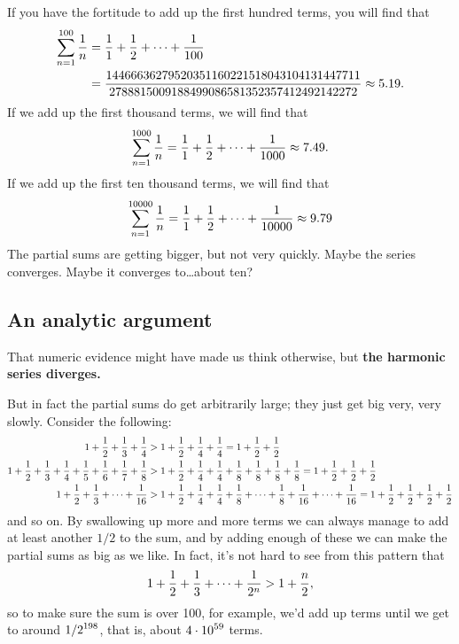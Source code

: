 If you have the fortitude to add up the first hundred terms, you will find that
\begin{align*}
\sum_{n=1}^{100} {1\over n} &= \frac{1}{1} + \frac{1}{2} + \cdots + \frac{1}{100} \\
&= \frac{14466636279520351160221518043104131447711}{2788815009188499086581352357412492142272} \approx 5.19.
\end{align*}
If we add up the first thousand terms, we will find that
\begin{align*}
\sum_{n=1}^{1000} {1\over n} &= \frac{1}{1} + \frac{1}{2} + \cdots + \frac{1}{1000} \approx 7.49. \\
\end{align*}
If we add up the first ten thousand terms, we will find that
\begin{align*}
\sum_{n=1}^{10000} {1\over n} &= \frac{1}{1} + \frac{1}{2} + \cdots + \frac{1}{10000} \approx 9.79 \\
\end{align*}
The partial sums are getting bigger, but not very quickly.  Maybe the
series converges.  Maybe it converges to\ldots about ten?

\subsection{An analytic argument}

That numeric evidence might have made us think otherwise, but
\textbf{the harmonic series diverges.}

But in fact the partial sums do get arbitrarily large; they just get
big very, very slowly. Consider the following:
\begin{align*}
\displaystyle 1+{1\over 2}+{1\over 3}+{1\over 4} &> 
1+{1\over 2}+{1\over 4}+{1\over
  4} = 1+{1\over 2}+{1\over 2} \\
\displaystyle 1+{1\over 2}+{1\over 3}+{1\over 4}+
{1\over 5}+{1\over 6}+{1\over
    7}+{1\over 8} &> 
1+{1\over 2}+{1\over 4}+{1\over 4}+{1\over 8}+{1\over 8}+{1\over
    8}+{1\over 8} = 1+{1\over 2}+{1\over 2}+{1\over 2} \\
\displaystyle 1+{1\over 2}+{1\over 3}+\cdots+{1\over16} &> 
1+{1\over 2}+{1\over 4}+{1\over 4}+{1\over 8}+\cdots+{1\over
  8}+{1\over16}+\cdots +{1\over16} =1+{1\over 2}+{1\over 2}+{1\over
  2}+{1\over 2} 
\end{align*}
\noindent
and so on. By swallowing up more and more terms we can always manage
to add at least another $1/2$ to the sum, and by adding enough of
these we can make the partial sums as big as we like. In fact, it's
not hard to see from this pattern that
$$1+{1\over 2}+{1\over 3}+\cdots+{1\over 2^n} > 1+{n\over 2},$$
so to make sure the sum is over 100, for example, we'd add
up terms until we get to around $\displaystyle 1/2^{198}$, that is,
about $\displaystyle 4\cdot 10^{59}$ terms.

